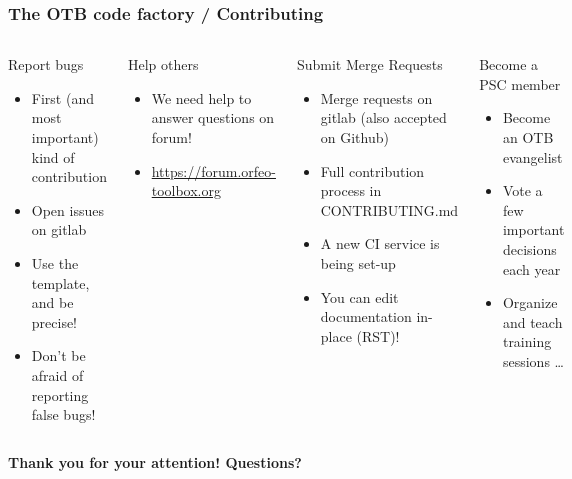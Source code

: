 \documentclass[8pt,aspectratio=169]{beamer}
\begin{document}
    \begin{frame}[fragile]
    \frametitle{The OTB code factory / Contributing}

    \begin{columns}
      \begin{block}{Report bugs}
        \begin{itemize}
        \item First (and most important) kind of contribution
        \item Open issues on gitlab
        \item Use the template, and be precise!
        \item Don't be afraid of reporting false bugs!
        \end{itemize}
      \end{block}

      \begin{block}{Help others}
        \begin{itemize}
        \item We need help to answer questions on forum!
        \item \small{\url{https://forum.orfeo-toolbox.org}}
        \end{itemize}
      \end{block}
    
      \begin{block}{Submit Merge Requests}
        \begin{itemize}
        \item Merge requests on gitlab (also accepted on Github)
        \item Full contribution process in CONTRIBUTING.md
        \item A new CI service is being set-up
        \item You can edit documentation in-place (RST)!
        \end{itemize}
      \end{block}

      \begin{block}{Become a PSC member}
        \begin{itemize}
          \item Become an OTB evangelist
          \item Vote a few important decisions each year
          \item Organize and teach training sessions \ldots
        \end{itemize}
      \end{block}
      
    \end{columns}

    \begin{center}
      \large{\textbf{Thank you for your attention! Questions?}}
      
    \end{center}
    
    \end{frame}
\end{document}
